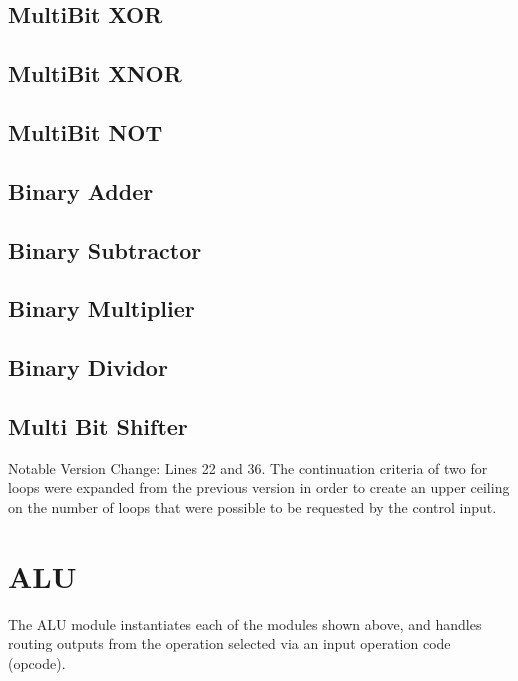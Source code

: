 \documentclass[12pt]{article}
\begin{document}
\subsection{MultiBit XOR}


\subsection{MultiBit XNOR}


\subsection{MultiBit NOT}



\subsection{Binary Adder}


\subsection{Binary Subtractor}


\subsection{Binary Multiplier}


\subsection{Binary Dividor}


\subsection{Multi Bit Shifter}
Notable Version Change: Lines 22 and 36. The continuation criteria of two for loops were expanded from the previous version in order to create an upper ceiling on the number of loops that were possible to be requested by the control input.


\section{ALU}
The ALU module instantiates each of the modules shown above, and handles routing outputs from the operation selected via an input operation code (opcode).

\end{document}
